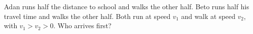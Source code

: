 Adan runs half the distance to school and walks the other half. Beto runs half his travel time and walks the other half. Both run at speed $v_1$ and walk at speed $v_2$, with $v_1>v_2>0$. Who arrives first?
